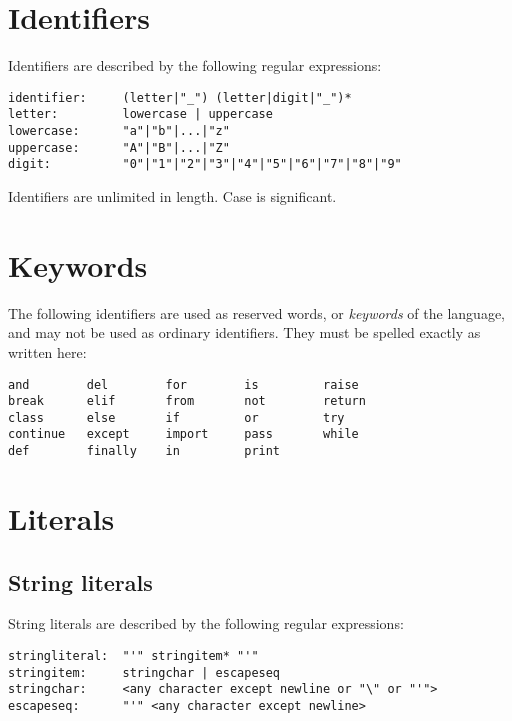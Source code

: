 \section{Identifiers}

Identifiers are described by the following regular expressions:

\begin{verbatim}
identifier:     (letter|"_") (letter|digit|"_")*
letter:         lowercase | uppercase
lowercase:      "a"|"b"|...|"z"
uppercase:      "A"|"B"|...|"Z"
digit:          "0"|"1"|"2"|"3"|"4"|"5"|"6"|"7"|"8"|"9"
\end{verbatim}

Identifiers are unlimited in length.  Case is significant.

\section{Keywords}

The following identifiers are used as reserved words, or {\em
keywords} of the language, and may not be used as ordinary
identifiers.  They must be spelled exactly as written here:

\begin{verbatim}
and        del        for        is         raise
break      elif       from       not        return
class      else       if         or         try
continue   except     import     pass       while
def        finally    in         print
\end{verbatim}


\section{Literals}

\subsection{String literals}

String literals are described by the following regular expressions:

\begin{verbatim}
stringliteral:  "'" stringitem* "'"
stringitem:     stringchar | escapeseq
stringchar:     <any character except newline or "\" or "'">
escapeseq:      "'" <any character except newline>
\end{verbatim}

